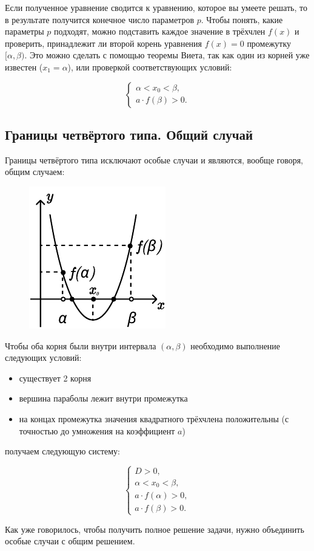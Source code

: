 Если полученное уравнение сводится к уравнению, которое вы умеете решать, то в результате получится
конечное число параметров $p$. Чтобы понять, какие параметры $p$ подходят, можно подставить каждое 
значение в трёхчлен $f(x)$ и проверить, принадлежит ли второй корень уравнения $f(x)=0$ промежутку
$[\alpha, \beta)$. Это можно сделать с помощью теоремы Виета, так как один из корней уже известен
($x_1 = \alpha$), или проверкой соответствующих условий:

\begin {equation*}
    \begin {cases}
        \alpha < x_0 < \beta, 
        \\
        a \cdot f(\beta) > 0.
    \end {cases}
\end {equation*}

\subsection {Границы четвёртого типа. Общий случай}

Границы четвёртого типа исключают особые случаи и являются, вообще говоря, общим случаем:

\begin {figure} [h]
    \begin {minipage} [b] {\linewidth}
        \centering
        \includegraphics [width=0.3\linewidth] {image/image_02.pdf}
    \end {minipage}
\end {figure}

Чтобы оба корня были внутри интервала $(\alpha, \beta)$ необходимо выполнение следующих условий:

\begin {itemize}
    \item {существует 2 корня}
    \item {вершина параболы лежит внутри промежутка}
    \item {на концах промежутка значения квадратного трёхчлена положительны (с точностью до 
    умножения на коэффициент $a$)}
\end {itemize}
получаем следующую систему:

\begin {equation*}
    \begin {cases}
        D > 0, 
        \\
        \alpha < x_0 < \beta,
        \\
        a \cdot f(\alpha) > 0,
        \\
        a \cdot f(\beta) > 0.
    \end {cases}
\end {equation*}

Как уже говорилось, чтобы получить полное решение задачи, нужно объединить особые случаи с общим 
решением.